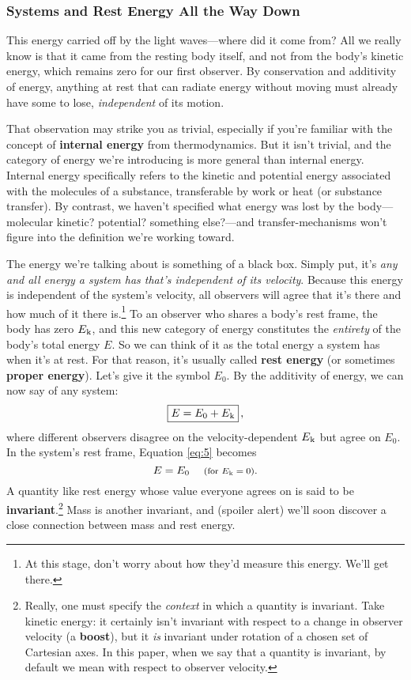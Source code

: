 \documentclass[12pt]{article}
\begin{document}
\subsubsection{Systems and Rest Energy All the Way Down}\label{sssec:sy}

This energy carried off by the light waves---where did it come from? All we really know is that it came from the resting body itself, and not from the body's kinetic energy, which remains zero for our first observer. By conservation and additivity of energy, anything at rest that can radiate energy without moving must already have some to lose, \emph{independent} of its motion.

That observation may strike you as trivial, especially if you're familiar with the concept of \textbf{internal energy} from thermodynamics. But it isn't trivial, and the category of energy we're introducing is more general than internal energy. Internal energy specifically refers to the kinetic and potential energy associated with the molecules of a substance, transferable by work or heat (or substance transfer). By contrast, we haven't specified what energy was lost by the body---molecular kinetic? potential? something else?---and transfer-mechanisms won't figure into the definition we're working toward.

The energy we're talking about is something of a black box. Simply put, it's \emph{any and all energy a system has that's independent of its velocity}. Because this energy is independent of the system's velocity, all observers will agree that it's there and how much of it there is.\footnote{\label{fn:re}At this stage, don't worry about how they'd measure this energy. We'll get there.} To an observer who shares a body's rest frame, the body has zero $E_{\mkern.5mu \textrm{k}}$, and this new category of energy constitutes the \emph{entirety} of the body's total energy $E$. So we can think of it as the total energy a system has when it's at rest. For that reason, it's usually called \textbf{rest energy} (or sometimes \textbf{proper energy}). Let's give it the symbol $E_0$. By the additivity of energy, we can now say of any system:
\begin{equation}\label{eq:5}
\boxed{E=E_0+E_{\mkern.5mu \textrm{k}}} \, ,
\end{equation}
where different observers disagree on the velocity-dependent $E_{\mkern.5mu \textrm{k}}$ but agree on $E_0$. In the system's rest frame, Equation \ref{eq:5} becomes
\begin{equation}\label{eq:6}
E=E_0 \quad \textrm{\footnotesize{ (for $E_{\mkern.5mu \textrm{k}}=0$)}}.
\end{equation}
A quantity like rest energy whose value everyone agrees on is said to be \textbf{invariant}.\footnote{\label{fn:inv}Really, one must specify the \emph{context} in which a quantity is invariant. Take kinetic energy: it certainly isn't invariant with respect to a change in observer velocity (a \textbf{boost}), but it \emph{is} invariant under rotation of a chosen set of Cartesian axes. In this paper, when we say that a quantity is invariant, by default we mean with respect to observer velocity.} Mass is another invariant, and (spoiler alert) we'll soon discover a close connection between mass and rest energy.
\end{document}
